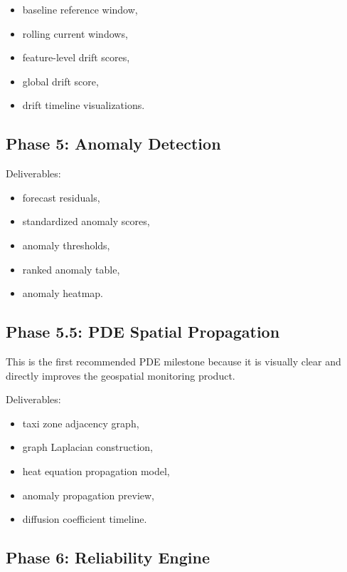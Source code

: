 \documentclass[11pt]{article}
\begin{document}
\begin{itemize}
    \item baseline reference window,
    \item rolling current windows,
    \item feature-level drift scores,
    \item global drift score,
    \item drift timeline visualizations.
\end{itemize}

\subsection{Phase 5: Anomaly Detection}

Deliverables:

\begin{itemize}
    \item forecast residuals,
    \item standardized anomaly scores,
    \item anomaly thresholds,
    \item ranked anomaly table,
    \item anomaly heatmap.
\end{itemize}

\subsection{Phase 5.5: PDE Spatial Propagation}

This is the first recommended PDE milestone because it is visually clear and directly improves the geospatial monitoring product.

Deliverables:

\begin{itemize}
    \item taxi zone adjacency graph,
    \item graph Laplacian construction,
    \item heat equation propagation model,
    \item anomaly propagation preview,
    \item diffusion coefficient timeline.
\end{itemize}

\subsection{Phase 6: Reliability Engine}
\end{document}
